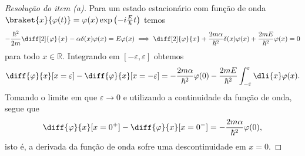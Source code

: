 \begin{proof}[Resolução do item (a)]
    Para um estado estacionário com função de onda \(\braket{x}{\varphi(t)} = \varphi(x)\exp\left(-i \frac{E}{\hbar} t\right)\) temos
    \begin{equation*}
        -\frac{\hbar^2}{2m}\diff[2]{\varphi}{x} - \alpha \delta(x) \varphi(x) = E\varphi(x) \implies \diff[2]{\varphi}{x} + \frac{2m \alpha}{\hbar^2} \delta(x)\varphi(x) + \frac{2m E}{\hbar^2}\varphi(x) = 0
    \end{equation*}
    para todo \(x \in \mathbb{R}\). Integrando em \([-\varepsilon, \varepsilon]\) obtemos
    \begin{equation*}
        \diff{\varphi}{x}[x = \varepsilon] - \diff{\varphi}{x}[x = -\varepsilon] = - \frac{2 m \alpha}{\hbar^2} \varphi(0) - \frac{2m E}{\hbar^2}\int_{-\varepsilon}^\varepsilon \dli{x} \varphi(x).
    \end{equation*}
    Tomando o limite em que \(\varepsilon \to 0\) e utilizando a continuidade da função de onda, segue que
    \begin{equation*}
        \diff{\varphi}{x}[x = 0^+] - \diff{\varphi}{x}[x = 0^-] = -\frac{2m \alpha}{\hbar^2}\varphi(0),
    \end{equation*}
    isto é, a derivada da função de onda sofre uma descontinuidade em \(x = 0\).
\end{proof}

